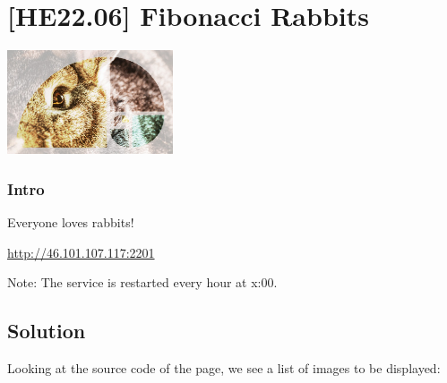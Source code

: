 
\hypertarget{he22.06}{%
\chapter{[HE22.06] Fibonacci Rabbits}\label{he22.06}}

\begin{marginfigure}
	\includegraphics[width=49mm]{level3/challenge6.jpg}
\end{marginfigure}
\subsection{Intro}
Everyone loves rabbits!

\noindent\url{http://46.101.107.117:2201}

\noindent
Note: The service is restarted every hour at x:00.
  

\section{Solution}\label{hv21.06-solution}

Looking at the source code of the page, we see a list of images to be
displayed:

